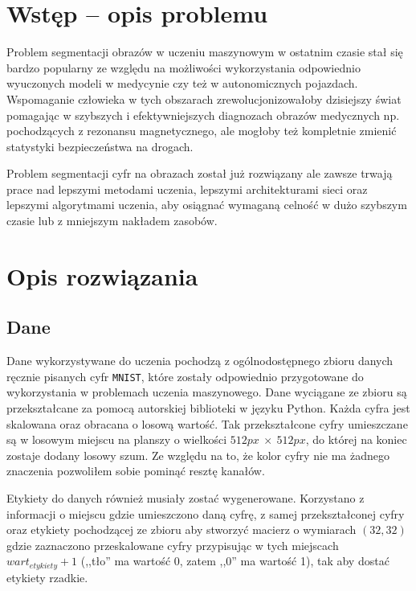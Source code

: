 \documentclass[10pt]{article}
\begin{document}
\section{Wstęp -- opis problemu}
\label{sec:wstep}

Problem segmentacji obrazów w uczeniu maszynowym w ostatnim czasie stał się bardzo popularny ze względu na możliwości wykorzystania odpowiednio wyuczonych modeli w medycynie czy też w autonomicznych pojazdach. Wspomaganie człowieka w tych obszarach zrewolucjonizowałoby dzisiejszy świat pomagając w szybszych i efektywniejszych diagnozach obrazów medycznych np. pochodzących z rezonansu magnetycznego, ale mogłoby też kompletnie zmienić statystyki bezpieczeństwa na drogach.

Problem segmentacji cyfr na obrazach został już rozwiązany ale zawsze trwają prace nad lepszymi metodami uczenia, lepszymi architekturami sieci oraz lepszymi algorytmami uczenia, aby osiągnać wymaganą celność w dużo szybszym czasie lub z mniejszym nakładem zasobów.

\section{Opis rozwiązania}

\subsection{Dane}

Dane wykorzystywane do uczenia pochodzą z ogólnodostępnego zbioru danych ręcznie pisanych cyfr \verb+MNIST+, które zostały odpowiednio przygotowane do wykorzystania w problemach uczenia maszynowego. Dane wyciągane ze zbioru są przekształcane za pomocą autorskiej biblioteki w języku Python. Każda cyfra jest skalowana oraz obracana o losową wartość. Tak przekształcone cyfry umieszczane są w losowym miejscu na planszy o wielkości $512px\ \times\ 512px$, do której na koniec zostaje dodany losowy szum. Ze względu na to, że kolor cyfry nie ma żadnego znaczenia pozwoliłem sobie pominąć resztę kanałów.

Etykiety do danych również musiały zostać wygenerowane. Korzystano z informacji o miejscu gdzie umieszczono daną cyfrę, z samej przekształconej cyfry oraz etykiety pochodzącej ze zbioru aby stworzyć macierz o wymiarach $(32, 32)$ gdzie zaznaczono przeskalowane cyfry przypisując w tych miejscach $wart_{etykiety} + 1$ (,,tło'' ma wartość 0, zatem ,,0'' ma wartość 1), tak aby dostać etykiety rzadkie.
\end{document}
